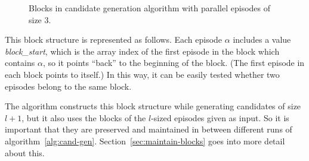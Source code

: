 \begin{figure}
\centering


\caption{Blocks in candidate generation algorithm with parallel episodes of size 3.}

\label{fig:blocks}
\end{figure}

This block structure is represented as follows.
Each episode $ \alpha $ includes a value \emph{block\_start}, which is the array index of the first episode in the block which contains $ \alpha $, so it points ``back'' to the beginning of the block. (The first episode in each block points to itself.) In this way, it can be easily tested whether two episodes belong to the same block.

The algorithm constructs this block structure while generating candidates of size $ l + 1 $, but it also uses the blocks of the $ l $-sized episodes given as input. So it is important that they are preserved and maintained in between different runs of algorithm~\ref{alg:cand-gen}. Section~\ref{sec:maintain-blocks} goes into more detail about this.

